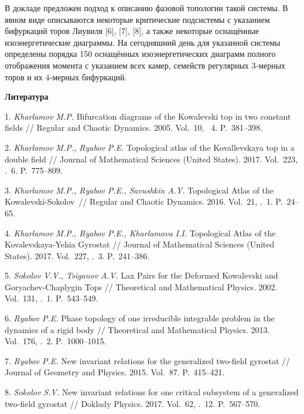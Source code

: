 
В докладе предложен подход к описанию фазовой топологии такой системы. В явном виде описываются некоторые критические подсистемы с указанием бифуркаций торов Лиувиля [6], [7], [8], а также некоторые оснащённые изоэнергетические диаграммы. На сегодняшний день для указанной системы определены порядка 150 оснащённых изоэнергетических диаграмм полного отображения момента с указанием всех камер, семейств регулярных 3-мерных торов и их 4-мерных бифуркаций.



\smallskip \centerline {\bf Литература} \nopagebreak

1. {\it Kharlamov M.P.} Bifurcation diagrams of the Kowalevski top in two constant fields // Regular and Chaotic Dynamics. 2005. Vol.~10, \No~4. P.~381--398.

2. {\it Kharlamov M.P., Ryabov P.E.} Topological atlas of the Kovallevskaya
top in a double field // Journal of Mathematical Sciences (United
States). 2017. Vol.~223, \No.~6. P.~775--809.

3. {\it Kharlamov M.P., Ryabov P.E., Savushkin A.Y.} Topologi\-cal Atlas of the
Kowalevski-Sokolov~// Regular and Chaotic Dynamics. 2016. Vol.~21, \No.~1. P.~24--65.

4. {\it Kharlamov M.P., Ryabov P.E., Kharlamova I.I.} Topo\-lo\-gical At\-las of the Kovalevskaya-Yehia Gyrostat // Journal of Mathe\-ma\-tical Sciences (United States). 2017. Vol.~227, \No.~3. P.~241--386.

5. {\it Sokolov V.V., Tsiganov A.V.} Lax Pairs for the Deformed Kowalevski and Goryachev-Chaplygin Tops // Theoretical and Mathematical Physics. 2002. Vol.~131, \No.~1. P.~543--549.

6. {\it Ryabov P.E.} Phase topology of one irreducible integrable problem in the dynamics of a rigid body // Theoretical and Mathematical Physics. 2013. Vol.~176, \No.~2. P.~1000--1015.

7. {\it Ryabov P.E.} New invariant relations for the generalized two-field gyrostat // Journal of Geometry and Physics. 2015. Vol.~87. P.~415--421.

8. {\it Sokolov S.V.} New invariant relations for one critical sub\-system of a generalized two-field gyrostat // Doklady Physics. 2017. Vol.~62, \No.~12. P.~567--570.
